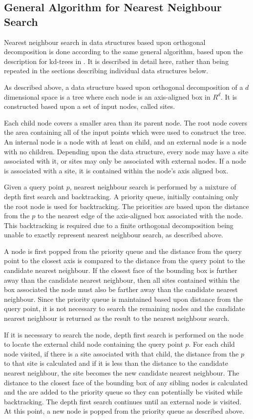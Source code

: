 \documentclass[mcs]{scsthesis}
\begin{document}
\subsection{General Algorithm for Nearest Neighbour Search}

Nearest neighbour search in data structures based upon orthogonal decomposition
is done according to the same general algorithm, based upon the description for
kd-trees in \cite{samet}. It is described in detail here, rather than being
repeated in the sections describing individual data structures below.

As described above, a data structure based upon orthogonal decomposition of
a $d$ dimensional space is a tree where each node is an axis-aligned box in
$R^d$. It is constructed based upon a set of input nodes, called sites.

Each child node covers a smaller area than its parent node. The root node
covers the area containing all of the input points which were used to construct
the tree. An internal node is a node with at least on child, and an external
node is a node with no children. Depending upon the data structure, every node
may have a site associated with it, or sites may only be associated with
external nodes. If a node is associated with a site, it is contained within the
node's axis aligned box.

Given a query point $p$, nearest neighbour search is performed by a mixture of
depth first search and backtracking. A priority queue, initially containing only
the root node is used for backtracking. The priorities are based upon the
distance from the $p$ to the nearest edge of the axis-aligned box associated
with the node. This backtracking is required due to a finite orthogonal
decomposition being unable to exactly represent nearest neighbour search, as
described above.

A node is first popped from the priority queue and the distance from the query
point to the closest axis is compared to the distance from the query point to
the candidate nearest neighbour. If the closest face of the bounding box is
further away than the candidate nearest neighbour, then all sites contained
within the box associated the node must also be farther away than the candidate
nearest neighbour. Since the priority queue is maintained based upon distance
from the query point, it is not necessary to search the remaining nodes and
the candidate nearest neighbour is returned as the result to the nearest
neighbour search.

If it is necessary to search the node, depth first search is performed on the
node to locate the external child node containing the query point $p$. For each
child node visited, if there is a site associated with that child, the distance
from the $p$ to that site is calculated and if it is less than the distance to
the candidate nearest neighbour, the site becomes the new candidate nearest
neighbour. The distance to the closest face of the bounding box of any sibling
nodes is calculated and the are added to the priority queue so they can
potentially be visited while backtracking. The depth first search continues
until an external node is visited. At this point, a new node is popped from
the priority queue as described above.
\end{document}
